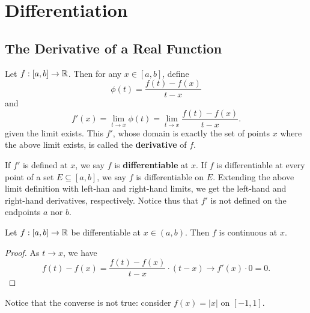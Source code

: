 
\chapter{Differentiation}

\section{The Derivative of a Real Function}

\begin{definition} %
    Let $f: [a, b] \rightarrow \mathbb{R}$. Then for any $x \in [a, b]$, define
    \[
        \phi(t) = \frac{f(t) - f(x)}{t - x}
    \]
    and
    \[
        f'(x) = \lim_{t \to x} \phi(t) = \lim_{t \to x} \frac{f(t) - f(x)}{t - x}.
    \]
    given the limit exists. This $f'$, whose domain is exactly the set of points $x$ where the above limit exists, is called the \textbf{derivative} of $f$.

    If $f'$ is defined at $x$, we say $f$ is \textbf{differentiable} at $x$. If $f$ is differentiable at every point of a set $E \subseteq [a, b]$, we say $f$ is differentiable on $E$. Extending the above limit definition with left-han and right-hand limits, we get the left-hand and right-hand derivatives, respectively. Notice thus that $f'$ is not defined on the endpoints $a$ nor $b$.
\end{definition}

\begin{theorem} %
    Let $f : [a, b] \rightarrow \mathbb{R}$ be differentiable at $x \in (a, b)$. Then $f$ is continuous at $x$. 

    \begin{proof}
        As $t \to x$, we have
        \[
            f(t) - f(x) = \frac{f(t) - f(x)}{t - x} \cdot (t - x) \to f'(x) \cdot 0 = 0.
        \]
    \end{proof}

    Notice that the converse is not true: consider $f(x) = |x|$ on $[-1, 1]$.
\end{theorem}

